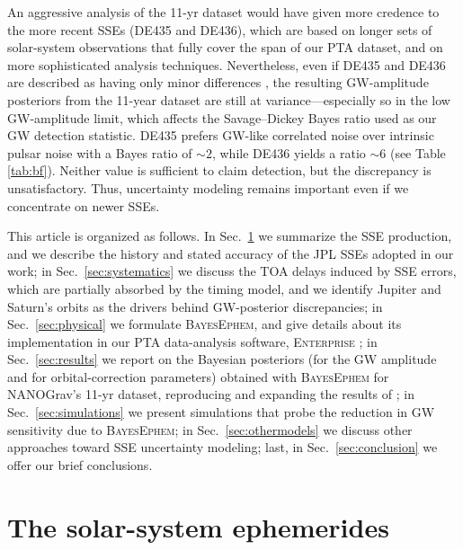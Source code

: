 \documentclass[iop,apj,twocolappendix]{emulateapj}
\begin{document}
An aggressive analysis of the 11-yr dataset would have given more credence to the more recent SSEs (DE435 and DE436), which are based on longer sets of solar-system observations that fully cover the span of our PTA dataset, and on more sophisticated analysis techniques.
Nevertheless, even if DE435 and DE436 are described as having only minor differences \citep{de435,de436}, the resulting GW-amplitude posteriors from the 11-year dataset are still at variance---especially so in the low GW-amplitude limit, which affects the Savage--Dickey Bayes ratio used as our GW detection statistic.
DE435 prefers GW-like correlated noise over intrinsic pulsar noise with a Bayes ratio of $\sim 2$, while DE436 yields a ratio $\sim 6$ (see Table \ref{tab:bf}). Neither value is sufficient to claim detection, but the discrepancy is unsatisfactory.
Thus, uncertainty modeling remains important even if we concentrate on newer SSEs.

This article is organized as follows. In Sec.\ \ref{sec:sses} we summarize the SSE production, and we describe the history and stated accuracy of the JPL SSEs adopted in our work; in Sec.\ \ref{sec:systematics} we discuss the TOA delays induced by SSE errors, which are partially absorbed by the timing model, and we identify Jupiter and Saturn's orbits as the drivers behind GW-posterior discrepancies; in Sec.\ \ref{sec:physical} we formulate \textsc{BayesEphem}, and give details about its implementation in our PTA data-analysis software, \textsc{Enterprise} \citep{enterprise}; in Sec.\ \ref{sec:results} we report on the Bayesian posteriors (for the GW amplitude and for orbital-correction parameters) obtained with \textsc{BayesEphem} for NANOGrav's 11-yr dataset, reproducing and expanding the results of \cite{2018ApJ...859...47A};
in Sec.\ \ref{sec:simulations} we present simulations that probe the reduction in GW sensitivity due to \textsc{BayesEphem};
in Sec.\ \ref{sec:othermodels} we discuss other approaches toward SSE uncertainty modeling;
last, in Sec.\ \ref{sec:conclusion} we offer our brief conclusions.  

\section{The solar-system ephemerides}
\label{sec:sses}
\end{document}

